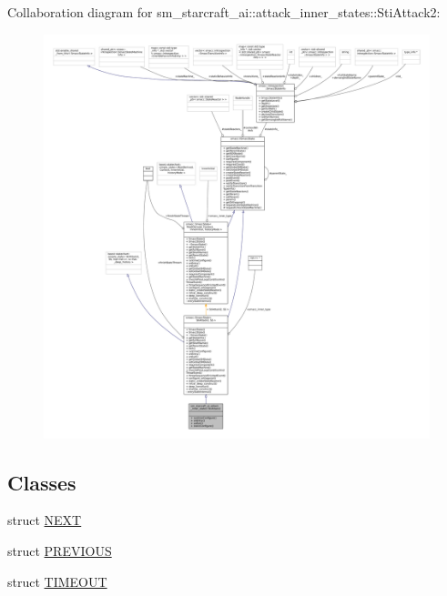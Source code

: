 Collaboration diagram for sm\+\_\+starcraft\+\_\+ai\+:\+:attack\+\_\+inner\+\_\+states\+:\+:Sti\+Attack2\+:
\nopagebreak
\begin{figure}[H]
\begin{center}
\leavevmode
\includegraphics[width=350pt]{structsm__starcraft__ai_1_1attack__inner__states_1_1StiAttack2__coll__graph}
\end{center}
\end{figure}
\subsection*{Classes}
\begin{DoxyCompactItemize}
\item 
struct \hyperlink{structsm__starcraft__ai_1_1attack__inner__states_1_1StiAttack2_1_1NEXT}{N\+E\+XT}
\item 
struct \hyperlink{structsm__starcraft__ai_1_1attack__inner__states_1_1StiAttack2_1_1PREVIOUS}{P\+R\+E\+V\+I\+O\+US}
\item 
struct \hyperlink{structsm__starcraft__ai_1_1attack__inner__states_1_1StiAttack2_1_1TIMEOUT}{T\+I\+M\+E\+O\+UT}
\end{DoxyCompactItemize}
